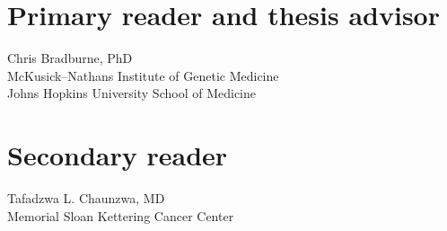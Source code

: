 \begin{singlespace}

    \section*{Primary reader and thesis advisor}

    Chris Bradburne, PhD \\
    McKusick--Nathans Institute of Genetic Medicine \\
    Johns Hopkins University School of Medicine

    \section*{Secondary reader}

    Tafadzwa L. Chaunzwa, MD \\
    Memorial Sloan Kettering Cancer Center


\end{singlespace}
